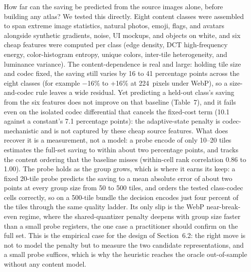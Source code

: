 \documentclass[3p,twocolumn]{elsarticle}
\begin{document}
How far can the saving be predicted from the source images alone, before
building any atlas? We tested this directly. Eight content classes were
assembled to span extreme image statistics, natural photos, emoji,
flags, and avatars alongside synthetic gradients, noise, UI mockups, and
objects on white, and six cheap features were computed per class (edge
density, DCT high-frequency energy, color-histogram entropy, unique
colors, inter-tile heterogeneity, and luminance variance). The
content-dependence is real and large: holding tile size and codec fixed,
the saving still varies by 16 to 41 percentage points across the eight
classes (for example −16\% to +16\% at 224~pixels under WebP), so a
size-and-codec rule leaves a wide residual. Yet predicting a held-out
class's saving from the six features does not improve on
that baseline (Table~7), and it fails even on the isolated codec
differential that cancels the fixed-cost term (10.1 against a
constant's 7.1 percentage points): the adaptive-state
penalty is codec-mechanistic and is not captured by these cheap source
features. What does recover it is a measurement, not a model: a probe
encode of only 10--20 tiles estimates the full-set saving to within
about two percentage points, and tracks the content ordering that the
baseline misses (within-cell rank correlation 0.86 to 1.00). The probe
holds as the group grows, which is where it earns its keep: a fixed
20-tile probe predicts the saving to a mean absolute error of about two
points at every group size from 50 to 500 tiles, and orders the tested
class-codec cells correctly, so on a 500-tile bundle the decision
encodes just four percent of the tiles through the same quality ladder.
Its only slip is the WebP near-break-even regime, where the
shared-quantizer penalty deepens with group size faster than a small
probe registers, the one case a practitioner should confirm on the full
set. This is the empirical case for the design of Section~6.2: the right
move is not to model the penalty but to measure the two candidate
representations, and a small probe suffices, which is why the heuristic
reaches the oracle out-of-sample without any content model.
\end{document}
